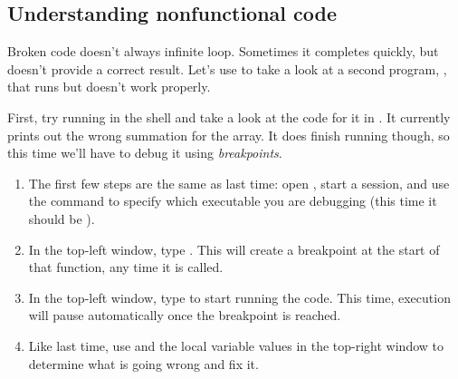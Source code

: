 \documentclass{tufte-handout}
\begin{document}
%


\subsection{Understanding nonfunctional code}

Broken code doesn't always infinite loop. Sometimes it completes quickly, but
doesn't provide a correct result. Let's use  to take a look at a
second program, , that runs but doesn't work properly.

First, try running  in the shell and take a look at the code
for it in . It currently prints out the wrong summation
for the array. It does finish running though, so this time we'll have to debug
it using \textit{breakpoints}.

\begin{enumerate}
  \item The first few steps are the same as last time: open ,
    start a  session, and use the  command to
    specify which executable you are debugging (this time it should be
    ).

  \item In the top-left window, type . This will create
    a breakpoint at the start of that function, any time it is called.

  \item In the top-left window, type  to start running the code.
    This time, execution will pause automatically once the breakpoint is reached.

  \item Like last time, use  and the local variable values in the
    top-right window to determine what is going wrong and fix it.


\end{enumerate}


\end{document}

